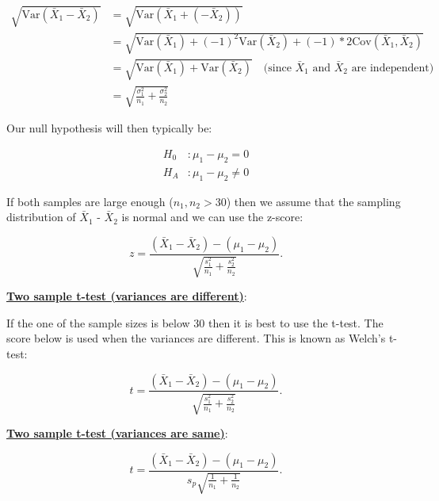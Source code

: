 \begin{equation}
\begin{split}
\sqrt{\text{Var}(\bar{X}_1 - \bar{X}_2)} & = \sqrt{\text{Var}(\bar{X}_1 + (- \bar{X}_2))} \\
&=\sqrt{\text{Var}(\bar{X}_1) + (-1)^2 \text{Var}(\bar{X}_2) + (-1)*2\text{Cov}(\bar{X}_1, \bar{X}_2)} \\
&=\sqrt{\text{Var}(\bar{X}_1) + \text{Var}(\bar{X}_2)}  \hspace{1em}   \text{(since $\bar{X}_1$ and $\bar{X}_2$ are independent)}\\
&=\sqrt{ \frac{\sigma_1^2}{n_1} + \frac{\sigma_2^2}{n_2}}
\end{split}
\end{equation}

Our null hypothesis will then typically be:

\begin{equation}
\begin{split}
H_0 &: \mu_1 - \mu_2 = 0 \\
H_A &:   \mu_1 - \mu_2 \neq 0
\end{split}
\end{equation}

\noindent If both samples are large enough ($n_1, n_2 > 30$) then we assume that the sampling distribution of $\bar{X}_1$ - $\bar{X}_2$ is normal and we can use the z-score:

\begin{equation}
z = \frac{(\bar{X}_1 -   \bar{X}_2) - (\mu_1 - \mu_2)}{\sqrt{\frac{s_1^2}{n_1} + \frac{s_2^2}{n_2}}}.
\end{equation}

\noindent \underline{\textbf{Two sample t-test (variances are different)}}:

If the one of the sample sizes is below 30 then it is best to use the t-test. The score below is used when the variances are different. This is known as Welch's t-test:

\begin{equation}
t = \frac{(\bar{X}_1 -   \bar{X}_2) - (\mu_1 - \mu_2)}{\sqrt{\frac{s_1^2}{n_1} + \frac{s_2^2}{n_2}}}.
\end{equation}

\noindent \underline{\textbf{Two sample t-test (variances are same)}}:

\begin{equation}
t = \frac{(\bar{X}_1 -   \bar{X}_2) - (\mu_1 - \mu_2)}{s_p\sqrt{\frac{1}{n_1} + \frac{1}{n_2}}}.
\end{equation}

